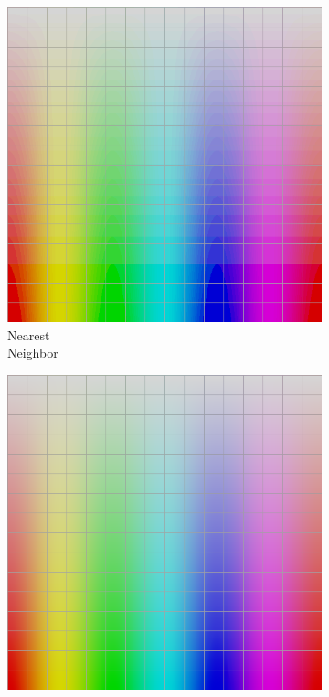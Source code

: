 \begin{figure}[t]
	\centering
	\captionsetup[subfigure]{font=footnotesize,labelfont=footnotesize}
	\captionsetup[subfigure]{justification=centering}
	\hspace{0.22\textwidth}
	\begin{subfigure}[t]{0.22\textwidth}
		\includegraphics[width=\linewidth]{img/uplifting_texture_copyNeighbor.png}
		\caption{Nearest\\Neighbor}
		\label{fig:sigUpliftNearestNeighbor}
	\end{subfigure} \hspace{0.05em}
	\begin{subfigure}[t]{0.22\textwidth}
		\includegraphics[width=\linewidth]{img/uplifting_texture_interpCoeff.png}

\end{subfigure}
\end{figure}
